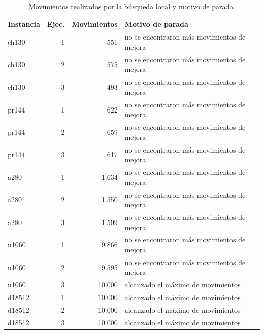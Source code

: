 \begin{table}[H]
\centering\small
\begin{tabular}{lrrl}
\toprule
Instancia & Ejec. & Movimientos & Motivo de parada \\
\midrule
ch130 & 1 & 551 & no se encontraron más movimientos de mejora \\
ch130 & 2 & 575 & no se encontraron más movimientos de mejora \\
ch130 & 3 & 493 & no se encontraron más movimientos de mejora \\
pr144 & 1 & 622 & no se encontraron más movimientos de mejora \\
pr144 & 2 & 659 & no se encontraron más movimientos de mejora \\
pr144 & 3 & 617 & no se encontraron más movimientos de mejora \\
a280 & 1 & 1{.}634 & no se encontraron más movimientos de mejora \\
a280 & 2 & 1{.}550 & no se encontraron más movimientos de mejora \\
a280 & 3 & 1{.}509 & no se encontraron más movimientos de mejora \\
u1060 & 1 & 9{.}866 & no se encontraron más movimientos de mejora \\
u1060 & 2 & 9{.}595 & no se encontraron más movimientos de mejora \\
u1060 & 3 & 10{.}000 & alcanzado el máximo de movimientos \\
d18512 & 1 & 10{.}000 & alcanzado el máximo de movimientos \\
d18512 & 2 & 10{.}000 & alcanzado el máximo de movimientos \\
d18512 & 3 & 10{.}000 & alcanzado el máximo de movimientos \\
\bottomrule
\end{tabular}
\caption{Movimientos realizados por la búsqueda local y motivo de parada.}
\label{tab:bl-parada}
\end{table}
